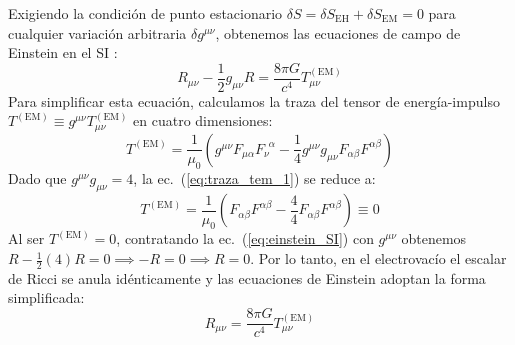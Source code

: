 Exigiendo la condición de punto estacionario $\delta S = \delta S_{\mathrm{EH}} + \delta S_{\mathrm{EM}} = 0$ para cualquier variación arbitraria $\delta g^{\mu\nu}$, obtenemos las ecuaciones de campo de Einstein en el SI \citep{M_P_Hobson_General_Relativity, Sean_Carroll_Spacetime}:
\begin{equation}
    R_{\mu\nu} - \frac{1}{2}g_{\mu\nu}R = \frac{8\pi G}{c^4} T_{\mu\nu}^{(\mathrm{EM})}
    \label{eq:einstein_SI}
\end{equation}
Para simplificar esta ecuación, calculamos la traza del tensor de energía-impulso $T^{(\mathrm{EM})} \equiv g^{\mu\nu} T_{\mu\nu}^{(\mathrm{EM})}$ en cuatro dimensiones:
\begin{equation}
    T^{(\mathrm{EM})} = \frac{1}{\mu_0} \left( g^{\mu\nu} F_{\mu\alpha} F_{\nu}^{\phantom{\nu}\alpha} - \frac{1}{4} g^{\mu\nu} g_{\mu\nu} F_{\alpha\beta} F^{\alpha\beta} \right)
    \label{eq:traza_tem_1}
\end{equation}
Dado que $g^{\mu\nu} g_{\mu\nu} = 4$, la ec.~(\ref{eq:traza_tem_1}) se reduce a:
\begin{equation}
    T^{(\mathrm{EM})} = \frac{1}{\mu_0} \left( F_{\alpha\beta} F^{\alpha\beta} - \frac{4}{4} F_{\alpha\beta} F^{\alpha\beta} \right) \equiv 0
    \label{eq:traza_tem_2}
\end{equation}
Al ser $T^{(\mathrm{EM})} = 0$, contratando la ec.~(\ref{eq:einstein_SI}) con $g^{\mu\nu}$ obtenemos $R - \frac{1}{2}(4)R = 0 \implies -R = 0 \implies R = 0$. Por lo tanto, en el electrovacío el escalar de Ricci se anula idénticamente y las ecuaciones de Einstein adoptan la forma simplificada:
\begin{equation}
    R_{\mu\nu} = \frac{8\pi G}{c^4} T_{\mu\nu}^{(\mathrm{EM})}
    \label{eq:einstein_electrovacio}
\end{equation}

